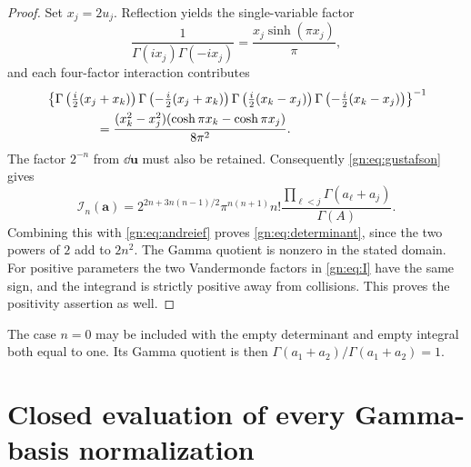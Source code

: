 \begin{proof}
Set $x_j=2u_j$.  Reflection yields the single-variable factor
\begin{equation}\label{gn:eq:single-reflection}
 \frac1{\Gamma(ix_j)\Gamma(-ix_j)}
          =\frac{x_j\sinh(\pi x_j)}\pi,
\end{equation}
and each four-factor interaction contributes
\begin{equation}\label{gn:eq:pair-reflection}
\begin{split}
 &\left\{
 \Gamma\left(\tfrac i2(x_j+x_k)\right)
 \Gamma\left(-\tfrac i2(x_j+x_k)\right)
 \Gamma\left(\tfrac i2(x_k-x_j)\right)
 \Gamma\left(-\tfrac i2(x_k-x_j)\right)
 \right\}^{-1}\\
 &\hspace{14mm}=
 \frac{(x_k^2-x_j^2)(\cosh\pi x_k-\cosh\pi x_j)}{8\pi^2}.
\end{split}
\end{equation}
The factor $2^{-n}$ from $\dd\mathbf u$ must also be retained.
Consequently \eqref{gn:eq:gustafson} gives
\begin{equation}\label{gn:eq:I-evaluation}
 \mathcal I_n(\mathbf a)
 =2^{2n+3n(n-1)/2}\pi^{n(n+1)}n!
       \frac{\prod_{\ell<j}\Gamma(a_\ell+a_j)}{\Gamma(A)}.
\end{equation}
Combining this with \eqref{gn:eq:andreief} proves
\eqref{gn:eq:determinant}, since the two powers of $2$ add to $2n^2$.
The Gamma quotient is nonzero in the stated domain.  For positive
parameters the two Vandermonde factors in \eqref{gn:eq:I} have the same
sign, and the integrand is strictly positive away from collisions.
This proves the positivity assertion as well.
\end{proof}

The case $n=0$ may be included with the empty determinant and empty
integral both equal to one.  Its Gamma quotient is then
$\Gamma(a_1+a_2)/\Gamma(a_1+a_2)=1$.

\section{Closed evaluation of every Gamma-basis normalization}
\label{gn:sec:normalization}


